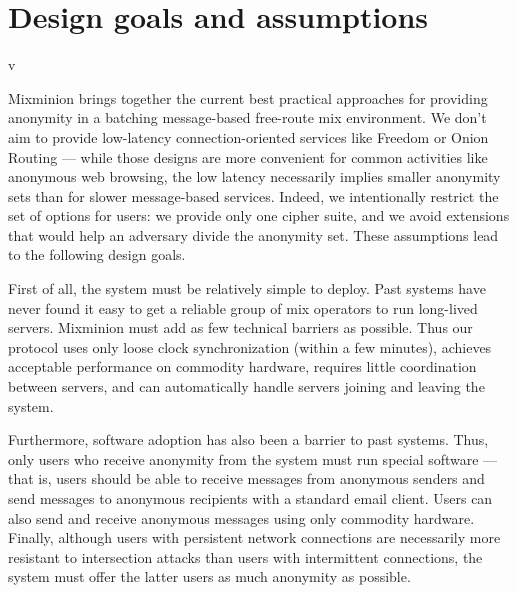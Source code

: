\documentclass[11pt]{IEEEtran}
\begin{document}


\section{Design goals and assumptions}
v\label{sec:assumptions}

Mixminion brings together the current best practical approaches
for providing anonymity in a batching message-based free-route mix
environment. We don't aim to provide low-latency connection-oriented
services like Freedom \cite{freedom} or Onion Routing \cite{goldschlag99}
--- while those designs are more convenient for common activities like
anonymous web browsing, the low latency necessarily implies smaller
anonymity sets than for slower message-based services. Indeed, we
intentionally restrict the set of options for users: we provide only one
cipher suite, and we avoid extensions that would help an adversary divide
the anonymity set. These assumptions lead to the following design goals.


First of all, the system must be relatively simple to deploy. Past systems
have never found it easy to get a reliable group of mix operators to
run long-lived servers. Mixminion must add as few technical barriers as
possible. Thus our protocol uses only loose clock synchronization (within
a few minutes), achieves acceptable performance on commodity hardware,
requires little coordination between servers, and can automatically
handle servers joining and leaving the system.

Furthermore, software adoption has also been a barrier to past
systems. Thus, only users who receive anonymity from the system must run
special software --- that is, users should be able to receive messages
from anonymous senders and send messages to anonymous recipients with a
standard email client. Users can also send and receive anonymous messages
using only commodity hardware. Finally, although users with persistent
network connections are necessarily more resistant to intersection
attacks than users with intermittent connections, the system must offer
the latter users as much anonymity as possible.
\end{document}
